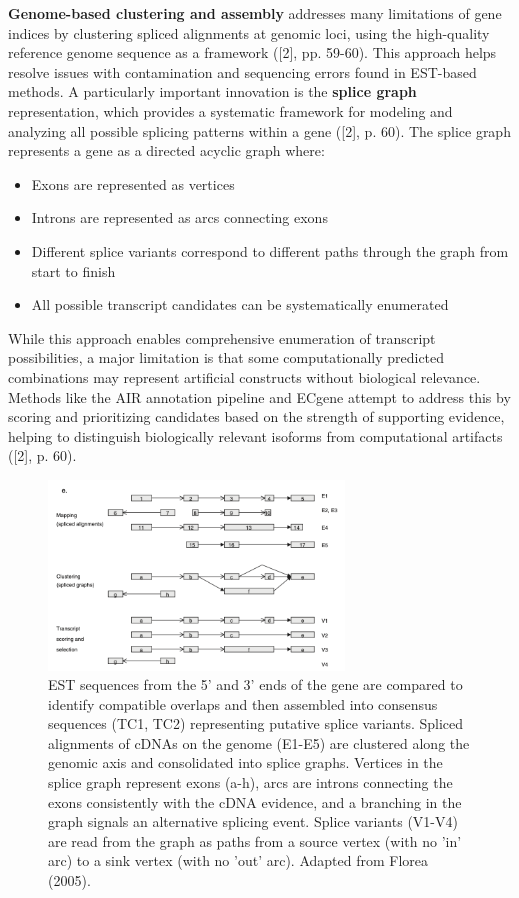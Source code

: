 \documentclass[12pt,a4paper]{article}
\begin{document}
\textbf{Genome-based clustering and assembly} addresses many limitations of gene indices by clustering spliced alignments at genomic loci, using the high-quality reference genome sequence as a framework ([2], pp. 59-60). This approach helps resolve issues with contamination and sequencing errors found in EST-based methods. A particularly important innovation is the \textbf{splice graph} representation, which provides a systematic framework for modeling and analyzing all possible splicing patterns within a gene ([2], p. 60). The splice graph represents a gene as a directed acyclic graph where:
\begin{itemize}
    \item Exons are represented as vertices
    \item Introns are represented as arcs connecting exons
    \item Different splice variants correspond to different paths through the graph from start to finish
    \item All possible transcript candidates can be systematically enumerated
\end{itemize}

While this approach enables comprehensive enumeration of transcript possibilities, a major limitation is that some computationally predicted combinations may represent artificial constructs without biological relevance. Methods like the AIR annotation pipeline and ECgene attempt to address this by scoring and prioritizing candidates based on the strength of supporting evidence, helping to distinguish biologically relevant isoforms from computational artifacts ([2], p. 60).

\begin{figure}[H]
\centering
\includegraphics[width=0.7\textwidth]{splice_graph_figure_2e_florea.png}
\caption{EST sequences from the 5' and 3' ends of the gene are compared to identify compatible overlaps and then assembled into consensus sequences (TC1, TC2) representing putative splice variants. Spliced alignments of cDNAs on the genome (E1-E5) are clustered along the genomic axis and consolidated into splice graphs. Vertices in the splice graph represent exons (a-h), arcs are introns connecting the exons consistently with the cDNA evidence, and a branching in the graph signals an alternative splicing event. Splice variants (V1-V4) are read from the graph as paths from a source vertex (with no 'in' arc) to a sink vertex (with no 'out' arc). Adapted from Florea (2005).}
\label{fig:splice_graph}
\end{figure}
\end{document}
